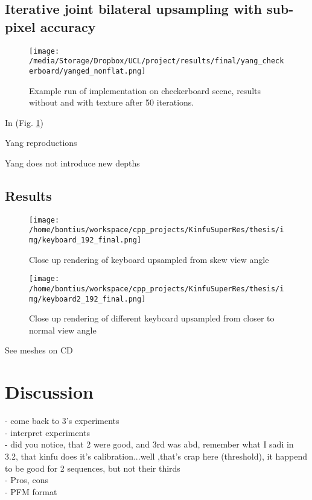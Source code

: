 \documentclass{ucl_thesis}
\newcommand{\figref}[1]{(Fig. \ref{#1})}
\begin{document}
\section{Iterative joint bilateral upsampling with sub-pixel accuracy}
\label{sec:yang}

\begin{figure}[h!]\centering 
        \texttt{[image: /media/Storage/Dropbox/UCL/project/results/final/yang\_checkerboard/yanged\_nonflat.png]}        
        \caption{Example run of implementation on checkerboard scene, results without and with texture after 50 iterations.}
        \label{fig:yang_checkerboard}
\end{figure}

In \figref{fig:yang_checkerboard}

Yang reproductions

Yang does not introduce new depths

\section{Results}
\label{sec:results}

\begin{figure}[h!]\centering
    \texttt{[image: /home/bontius/workspace/cpp\_projects/KinfuSuperRes/thesis/img/keyboard\_192\_final.png]}
    \caption{Close up rendering of keyboard upsampled from skew view angle}
    \label{fig:keyboard_192}
\end{figure}

\begin{figure}[h!]\centering
    \texttt{[image: /home/bontius/workspace/cpp\_projects/KinfuSuperRes/thesis/img/keyboard2\_192\_final.png]}
    \caption{Close up rendering of different keyboard upsampled from closer to normal view angle}
    \label{fig:keyboard2_192}
\end{figure}

See meshes on CD

\chapter{Discussion} 
\label{chp:discussion}
    - come back to 3's experiments\\
    - interpret experiments\\
    - did you notice, that 2 were good, and 3rd was abd, remember what I sadi in 3.2, that kinfu does it's calibration...well ,that's crap here (threshold), it happend to be good for 2 sequences, but not their thirds \\
-     Pros, cons \\
- PFM format \\
\end{document}
